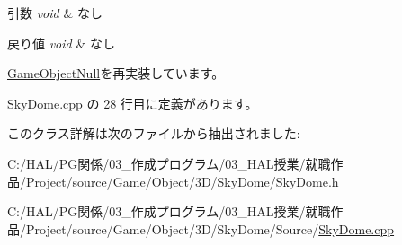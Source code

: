\begin{DoxyParams}{引数}
{\em void} & なし \\
\hline
\end{DoxyParams}

\begin{DoxyRetVals}{戻り値}
{\em void} & なし \\
\hline
\end{DoxyRetVals}


\mbox{\hyperlink{class_game_object_null_aeeb51b7e7aa41fd0b16f8f7c016bdb55}{Game\+Object\+Null}}を再実装しています。



 Sky\+Dome.\+cpp の 28 行目に定義があります。



このクラス詳解は次のファイルから抽出されました\+:\begin{DoxyCompactItemize}
\item 
C\+:/\+H\+A\+L/\+P\+G関係/03\+\_\+作成プログラム/03\+\_\+\+H\+A\+L授業/就職作品/\+Project/source/\+Game/\+Object/3\+D/\+Sky\+Dome/\mbox{\hyperlink{_sky_dome_8h}{Sky\+Dome.\+h}}\item 
C\+:/\+H\+A\+L/\+P\+G関係/03\+\_\+作成プログラム/03\+\_\+\+H\+A\+L授業/就職作品/\+Project/source/\+Game/\+Object/3\+D/\+Sky\+Dome/\+Source/\mbox{\hyperlink{_sky_dome_8cpp}{Sky\+Dome.\+cpp}}\end{DoxyCompactItemize}

